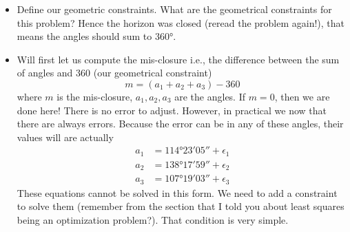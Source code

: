 \documentclass[]{scrartcl}
\begin{document}
\begin{itemize}
	\item Define our geometric constraints. What are the geometrical constraints for this problem? Hence the horizon was closed (reread the problem again!), that means the angles should sum to \ang{360}.
	\item Will first let us compute the mis-closure i.e., the difference between the sum of angles and 360 (our geometrical constraint)
	\begin{equation}
	m = (a_1 + a_2 + a_3) - 360
	\end{equation}
	where $m$ is the mis-closure, $a_1,a_2,a_3$ are the angles. If $m=0$, then we are done here! There is no error to adjust. However, in practical we now that there are always errors. Because the error can be in any of these angles, their values will are actually
	\begin{eqnarray}
	\label{eqn:observations}
	a_1 &= \ang{114; 23; 05} + \epsilon_1\\
	a_2 &= \ang{138; 17; 59} + \epsilon_2\\
	a_3 &= \ang{107; 19; 03} + \epsilon_3
	\end{eqnarray}
	These equations cannot be solved in this form. We need to add a constraint to solve them (remember from the section that I told you about least squares being an optimization problem?). That condition is very simple.
	

\end{itemize}
\end{document}

